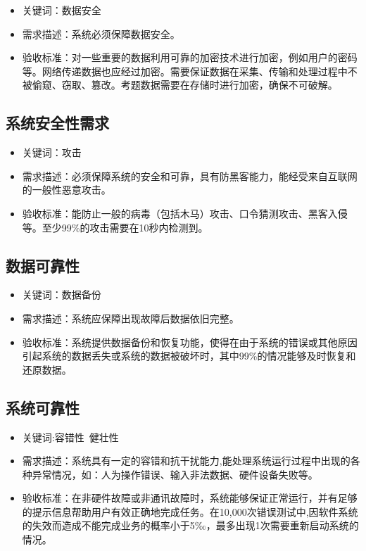 \documentclass[hyperref, a4paper]{ctexart}
\providecommand{\tightlist}{%
  \setlength{\itemsep}{0pt}\setlength{\parskip}{0pt}}
\begin{document}
\begin{itemize}
\tightlist
\item
  关键词：数据安全
\item
  需求描述：系统必须保障数据安全。
\item
  验收标准：对一些重要的数据利用可靠的加密技术进行加密，例如用户的密码等。网络传递数据也应经过加密。需要保证数据在采集、传输和处理过程中不被偷窥、窃取、篡改。考题数据需要在存储时进行加密，确保不可破解。
\end{itemize}

\hypertarget{ux7cfbux7edfux5b89ux5168ux6027ux9700ux6c42}{%
\subsection{系统安全性需求}\label{ux7cfbux7edfux5b89ux5168ux6027ux9700ux6c42}}

\begin{itemize}
\tightlist
\item
  关键词：攻击
\item
  需求描述：必须保障系统的安全和可靠，具有防黑客能力，能经受来自互联网的一般性恶意攻击。
\item
  验收标准：能防止一般的病毒（包括木马）攻击、口令猜测攻击、黑客入侵等。至少99\%的攻击需要在10秒内检测到。
\end{itemize}

\hypertarget{ux6570ux636eux53efux9760ux6027}{%
\subsection{数据可靠性}\label{ux6570ux636eux53efux9760ux6027}}

\begin{itemize}
\tightlist
\item
  关键词：数据备份
\item
  需求描述：系统应保障出现故障后数据依旧完整。
\item
  验收标准：系统提供数据备份和恢复功能，使得在由于系统的错误或其他原因引起系统的数据丢失或系统的数据被破坏时，其中99\%的情况能够及时恢复和还原数据。
\end{itemize}

\hypertarget{ux7cfbux7edfux53efux9760ux6027}{%
\subsection{系统可靠性}\label{ux7cfbux7edfux53efux9760ux6027}}

\begin{itemize}
\tightlist
\item
  关键词:容错性~健壮性
\item
  需求描述：系统具有一定的容错和抗干扰能力,能处理系统运行过程中出现的各种异常情况，如：人为操作错误、输入非法数据、硬件设备失败等。
\item
  验收标准：在非硬件故障或非通讯故障时，系统能够保证正常运行，并有足够的提示信息帮助用户有效正确地完成任务。在10,000次错误测试中,因软件系统的失效而造成不能完成业务的概率小于5‰，最多出现1次需要重新启动系统的情况。
\end{itemize}
\end{document}
